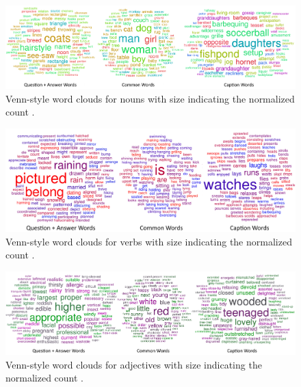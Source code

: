 \begin{figure}
\centering
\includegraphics[width=0.9\linewidth]{figures/abstract_nouns.png}
\caption{Venn-style word clouds \cite{CoppersmithKelly14} for nouns with size indicating the normalized count .}
\label{fig:noun_cloud_abs}
\end{figure}

\begin{figure}
\centering
\includegraphics[width=0.9\linewidth]{figures/abstract_verbs.png}
\caption{Venn-style word clouds \cite{CoppersmithKelly14} for verbs with size indicating the normalized count .}
\label{fig:verb_cloud_abs}
\end{figure}

\begin{figure}
\centering
\includegraphics[width=0.9\linewidth]{figures/abstract_adjectives.png}
\caption{Venn-style word clouds \cite{CoppersmithKelly14} for adjectives with size indicating the normalized count .}
\label{fig:adj_cloud_abs}
\end{figure}
\clearpage

